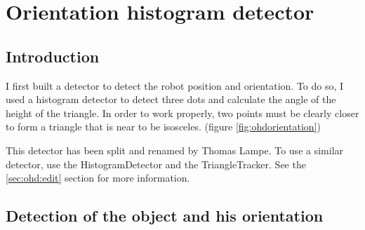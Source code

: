 \section[Orientation histogram detector (Triangle tracker)]{Orientation histogram detector}
\label{sec:ohd}

\subsection{Introduction}
\label{sec:ohd:intro}


    I first built a detector to detect the robot position and orientation. 
    To do so, I used a histogram detector to detect three dots and calculate
    the angle of the height of the triangle. In order to work properly, two 
    points must be clearly closer to form a triangle that is near to be 
    isosceles. (figure \ref{fig:ohdorientation})

    This detector has been split and renamed by Thomas Lampe. 
    To use a similar detector, 
    use the HistogramDetector and the 
    TriangleTracker. See the \ref{sec:ohd:edit} section for more 
    information.

\subsection{Detection of the object and his orientation}
\label{sec:ohd:detection}

